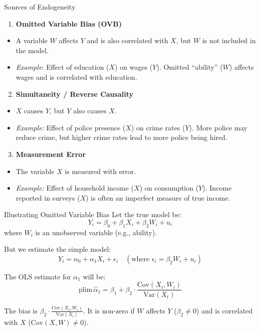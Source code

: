 \documentclass[
  ignorenonframetext,
  aspectratio=169]{beamer}
\providecommand{\tightlist}{%
  \setlength{\itemsep}{0pt}\setlength{\parskip}{0pt}}
\newcommand{\Cov}{\text{Cov}}
\newcommand{\Var}{\text{Var}}
\begin{document}
\begin{frame}{Sources of Endogeneity}
\label{sources-of-endogeneity}
\begin{enumerate}
\tightlist
\item
  \textbf{Omitted Variable Bias (OVB)}
\end{enumerate}

\begin{itemize}
\tightlist
\item
  A variable \(W\) affects \(Y\) and is also correlated with \(X\), but
  \(W\) is not included in the model.
\item
  \emph{Example}: Effect of education (\(X\)) on wages (\(Y\)). Omitted
  ``ability'' (\(W\)) affects wages and is correlated with education.
\end{itemize}

\begin{enumerate}
\setcounter{enumi}{1}
\tightlist
\item
  \textbf{Simultaneity / Reverse Causality}
\end{enumerate}

\begin{itemize}
\tightlist
\item
  \(X\) causes \(Y\), but \(Y\) also causes \(X\).
\item
  \textit{Example:} Effect of police presence (\(X\)) on crime rates
  (\(Y\)). More police may reduce crime, but higher crime rates lead to
  more police being hired.
\end{itemize}

\begin{enumerate}
\setcounter{enumi}{2}
\tightlist
\item
  \textbf{Measurement Error}
\end{enumerate}

\begin{itemize}
\tightlist
\item
  The variable \(X\) is measured with error.
\item
  \textit{Example:} Effect of household income (\(X\)) on consumption
  (\(Y\)). Income reported in surveys (\(X\)) is often an imperfect
  measure of true income.
\end{itemize}
\end{frame}

\begin{frame}{Illustrating Omitted Variable Bias}
\label{illustrating-omitted-variable-bias}
Let the true model be:
\[Y_i = \beta_0 + \beta_1 X_i + \beta_2 W_i + u_i\] where \(W_i\) is an
unobserved variable (e.g., ability).

But we estimate the simple model:
\[Y_i = \alpha_0 + \alpha_1 X_i + \epsilon_i \quad (\text{where } \epsilon_i = \beta_2 W_i + u_i)\]

The OLS estimate for \(\alpha_1\) will be:
\[\text{plim} \, \hat{\alpha}_1 = \beta_1 + \beta_2 \cdot \frac{\Cov(X_i, W_i)}{\Var(X_i)}\]

The bias is \(\beta_2 \cdot \frac{\Cov(X_i, W_i)}{\Var(X_i)}\). It is
non-zero if \(W\) affects \(Y\) (\(\beta_2 \neq 0\)) and is correlated
with \(X\) (\(\Cov(X,W) \neq 0\)).
\end{frame}
\end{document}
